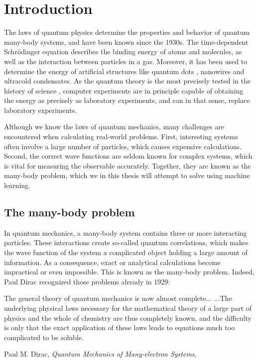 \chapter{Introduction}
The laws of quantum physics determine the properties and behavior of quantum many-body systems, and have been known since the 1930s. The time-dependent Schrödinger equation describes the binding energy of atoms and molecules, as well as the interaction between particles in a gas. Moreover, it has been used to determine the energy of artificial structures like quantum dots \supercite{reimann_electronic_2002}, nanowires and ultracold condensates. As the quantum theory is the most precisely tested in the history of science \supercite{odom_new_2006}, computer experiments are in principle capable of obtaining the energy as precisely as laboratory experiments, and can in that sense, replace laboratory experiments.

Although we know the laws of quantum mechanics, many challenges are encountered when calculating real-world problems. First, interesting systems often involve a large number of particles, which causes expensive calculations. Second, the correct wave functions are seldom known for complex systems, which is vital for measuring the observable accurately. Together, they are known as the many-body problem, which we in this thesis will attempt to solve using machine learning.

\section{The many-body problem}
In quantum mechanics, a many-body system contains three or more interacting particles. These interactions create so-called quantum correlations, which makes the wave function of the system a complicated object holding a large amount of information. As a consequence, exact or analytical calculations become impractical or even impossible. This is known as the many-body problem. Indeed, Paul Dirac recognized those problems already in 1929:

\begin{shadequote}{
		The general theory of quantum mechanics is now almost complete... ...The underlying physical laws necessary for the mathematical theory of a large part of physics and the whole of chemistry are thus completely known, and the difficulty is only that the exact application of these laws leads to equations much too complicated to be soluble. \par Paul M. Dirac, \emph{Quantum Mechanics of Many-electron Systems}, \supercite{dirac_paul_adrien_maurice_quantum_1929}}
\end{shadequote}


